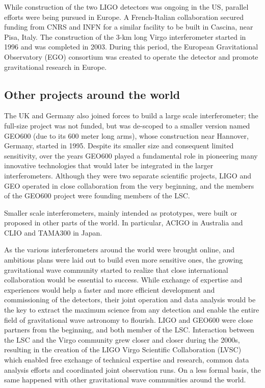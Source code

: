 While construction of the two LIGO detectors was ongoing in the US, parallel efforts 
were being pursued in Europe. A French-Italian collaboration secured funding from CNRS and INFN for a 
similar facility to be built in Cascina, near Pisa, Italy.
The construction of the 3-km long Virgo interferometer started in 1996 and was completed in 2003.
During this period, the European Gravitational Observatory (EGO) consortium was created to operate the detector 
and promote gravitational research in Europe.

\subsection{Other projects around the world}
The UK and Germany also joined forces to build a large scale interferometer; the full-size project was not funded, but was de-scoped to a smaller version named GEO600 (due to its 600 meter long arms), 
whose construction near Hannover, Germany, started in 1995. Despite its smaller size and consequent limited sensitivity, over the years GEO600 played a fundamental role in pioneering many innovative technologies that would later be integrated in the larger interferometers.
Although they were two separate scientific projects, LIGO and GEO operated in close collaboration from the very beginning, and the members of the GEO600 project were founding members of the LSC.

Smaller scale interferometers, mainly intended as prototypes, were built or 
proposed in other parts of the world. In particular, ACIGO in Australia and 
CLIO and TAMA300 in Japan. 

As the various interferometers around the world were brought online, and ambitious plans were laid out to build even more sensitive ones, the growing gravitational wave community started to realize that close international collaboration would be essential to success.
While exchange of expertise and experiences would help a faster and more efficient development and commissioning of the detectors, their joint operation and data analysis would be the key to extract the maximum science from any detection and enable the entire field of gravitational wave astronomy to flourish.
LIGO and GEO600 were close partners from the beginning, and both member of the LSC. Interaction between the LSC and the Virgo community grew closer and closer during the 2000s, resulting in the creation of the LIGO Virgo Scientific Collaboration (LVSC) which enabled free exchange of technical expertise and research, common data analysis efforts and coordinated joint observation runs.
On a less formal basis, the same happened with other gravitational wave communities around the world.
